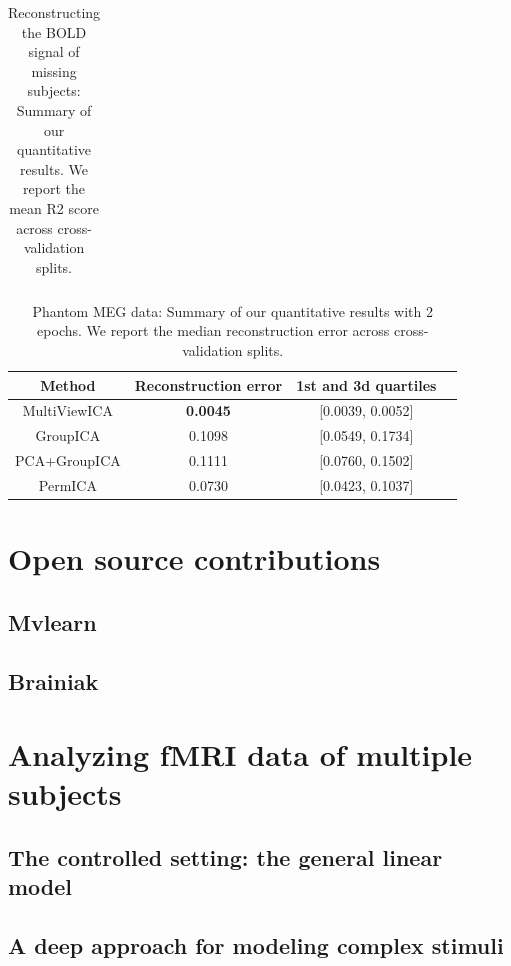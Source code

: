 \documentclass{report}
\begin{document}
\begin{table}
\begin{tabular}{|c|c | c | c|}
         
    \end{tabular}
    \caption{Reconstructing the BOLD signal of missing subjects: Summary of our quantitative results. We report the mean R2 score across cross-validation splits.}
    \label{tab:recon}
\end{table}

\begin{table}
    \centering
    \begin{tabular}{|c|c|c|c}
    \hline
         \textbf{Method} & \textbf{Reconstruction error} & \textbf{1st and 3d quartiles} 
         \\
         \hline
         MultiViewICA & \textbf{0.0045} & [0.0039, 0.0052] \\ 
GroupICA & 0.1098 & [0.0549, 0.1734] \\ 
PCA+GroupICA & 0.1111 & [0.0760, 0.1502] \\ 
PermICA & 0.0730 & [0.0423, 0.1037] \\ 
\hline
    \end{tabular}
    \caption{Phantom MEG data: Summary of our quantitative results with 2 epochs. We report the median reconstruction error across cross-validation splits.}
    \label{tab:meg}
\end{table}
\chapter{Open source contributions}
\section{Mvlearn}
\section{Brainiak}

\chapter{Analyzing fMRI data of multiple subjects}
\section{The controlled setting: the general linear model}
\section{A deep approach for modeling complex stimuli}
\end{document}

